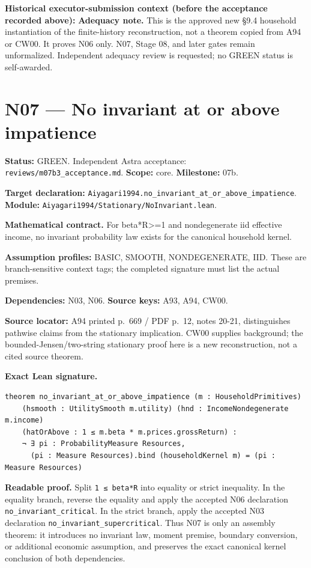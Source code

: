 \documentclass[
  11pt,
]{article}
\let\LedgerOriginalTexttt\texttt
\renewcommand{\texttt}[1]{{\small\LedgerOriginalTexttt{#1}}}
\begin{document}
\textbf{Historical executor-submission context (before the acceptance
recorded above):} \textbf{Adequacy note.} This is the approved new §9.4
household instantiation of the finite-history reconstruction, not a
theorem copied from A94 or CW00. It proves N06 only. N07, Stage 08, and
later gates remain unformalized. Independent adequacy review is
requested; no GREEN status is self-awarded.

\section{N07 --- No invariant at or above
impatience}\label{n07-no-invariant-at-or-above-impatience}

\textbf{Status:} GREEN. Independent Astra acceptance:
\texttt{reviews/m07b3\_acceptance.md}. \textbf{Scope:} core.
\textbf{Milestone:} 07b.

\textbf{Target declaration:}
\texttt{Aiyagari1994.no\_invariant\_at\_or\_above\_impatience}.\\
\textbf{Module:} \texttt{Aiyagari1994/Stationary/NoInvariant.lean}.

\textbf{Mathematical contract.} For beta*R\textgreater=1 and
nondegenerate iid effective income, no invariant probability law exists
for the canonical household kernel.

\textbf{Assumption profiles:} BASIC, SMOOTH, NONDEGENERATE, IID. These
are branch-sensitive context tags; the completed signature must list the
actual premises.

\textbf{Dependencies:} N03, N06. \textbf{Source keys:} A93, A94, CW00.

\textbf{Source locator:} A94 printed p.~669 / PDF p.~12, notes 20-21,
distinguishes pathwise claims from the stationary implication. CW00
supplies background; the bounded-Jensen/two-string stationary proof here
is a new reconstruction, not a cited source theorem.

\textbf{Exact Lean signature.}

\begin{verbatim}
theorem no_invariant_at_or_above_impatience (m : HouseholdPrimitives)
    (hsmooth : UtilitySmooth m.utility) (hnd : IncomeNondegenerate m.income)
    (hatOrAbove : 1 ≤ m.beta * m.prices.grossReturn) :
    ¬ ∃ pi : ProbabilityMeasure Resources,
      (pi : Measure Resources).bind (householdKernel m) = (pi : Measure Resources)
\end{verbatim}

\textbf{Readable proof.} Split \texttt{1\ ≤\ beta*R} into equality or
strict inequality. In the equality branch, reverse the equality and
apply the accepted N06 declaration \texttt{no\_invariant\_critical}. In
the strict branch, apply the accepted N03 declaration
\texttt{no\_invariant\_supercritical}. Thus N07 is only an assembly
theorem: it introduces no invariant law, moment premise, boundary
conversion, or additional economic assumption, and preserves the exact
canonical kernel conclusion of both dependencies.
\end{document}
